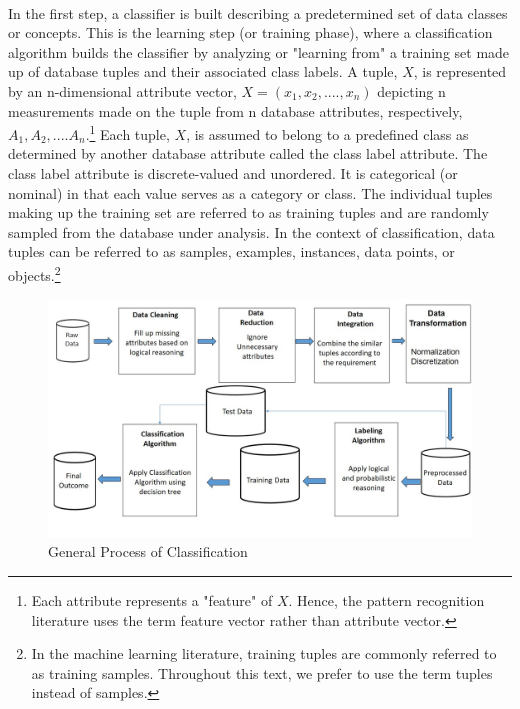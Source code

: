 \paragraph{}
In the first step, a classifier is built describing a predetermined set of data classes or concepts. This is the
learning step (or training phase), where a classification algorithm builds the classifier by analyzing or
"learning from" a training set made up of database tuples and their associated class labels. A tuple, $ X$, is
represented by an n-dimensional attribute vector, $ X= (x_{1},x_{2},....,x_{n})$ depicting n measurements made on the tuple from n database attributes, respectively,$A_{1},A_{2},....A_{n} $.\footnote{\label{first}Each attribute represents a "feature" of $X$. Hence, the pattern recognition literature uses the term feature vector rather than
attribute vector. } 
Each tuple, $X$, is assumed to belong to a predefined class as determined by another database attribute called the class label attribute. The class label
attribute is discrete-valued and unordered. It is categorical (or nominal) in that each value serves as a category
or class. The individual tuples making up the training set are referred to as training tuples and are randomly
sampled from the database under analysis. In the context of classification, data tuples can be referred to as
samples, examples, instances, data points, or objects.\footnote{\label{second}In the machine learning literature, training tuples are commonly referred to as training samples. Throughout this text, we prefer to use the term tuples instead of samples.}
\begin{figure}
   \centering
  \includegraphics[width=\linewidth]{Figures/classification.jpg}
  \decoRule
  \caption[Classification]{General Process of Classification}
  \label{fig:classification}
\end{figure}

